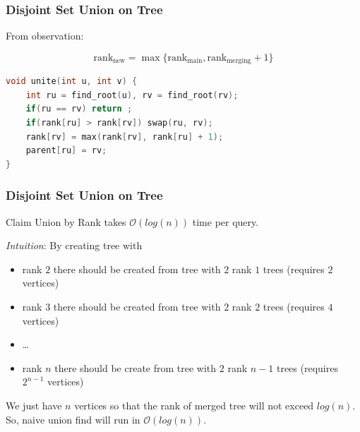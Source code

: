 \begin{frame}[fragile]
\frametitle{Disjoint Set Union on Tree}

From observation:

\[
    \mathrm{rank}_{\mathrm{new}} = \max\{\mathrm{rank}_{\mathrm{main}}, \mathrm{rank}_{\mathrm{merging}} + 1\}
\]

\begin{lstlisting}[language=C++, basicstyle=\small]
void unite(int u, int v) {
    int ru = find_root(u), rv = find_root(rv);
    if(ru == rv) return ;
    if(rank[ru] > rank[rv]) swap(ru, rv);
    rank[rv] = max(rank[rv], rank[ru] + 1);
    parent[ru] = rv;
}
\end{lstlisting}

\end{frame}

\begin{frame}
\frametitle{Disjoint Set Union on Tree}
\begin{block}{Claim}
Union by Rank takes $\mathcal{O}(log(n))$ time per query.
\end{block}
\textit{Intuition}:
By creating tree with 
\begin{itemize}
    \item rank $2$ there should be created from tree with $2$ rank $1$ trees (requires $2$ vertices)\\
    \item rank $3$ there should be created from tree with $2$ rank $2$ trees (requires $4$ vertices)\\
    \item \dots
    \item rank $n$ there should be create from tree with $2$ rank $n-1$ trees (requires $2^{n - 1}$ vertices)
\end{itemize}

We just have $n$ vertices so that the rank of merged tree will not exceed $log(n)$. So, naive union find will run in $\mathcal{O}(log(n))$.
\end{frame}

